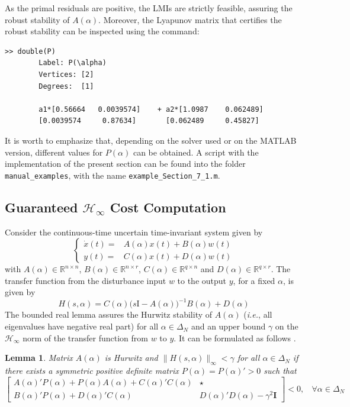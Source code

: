 \documentclass[english,11pt]{article}
\theoremstyle{break} \theorembodyfont{\small\rm}
\newtheorem{lema}{\bf Lemma}
\newenvironment{Plema}
{\begin{lema}} {\hspace*{\fill}\nolinebreak[1]
\end{lema}
}
\newcommand{\Hi}{{\mathcal{H}}_{\infty}}
\begin{document}
As the primal residuals are positive, the LMIs are strictly feasible, assuring the robust stability of $A(\alpha)$. Moreover, the Lyapunov matrix that certifies the robust stability can be inspected using the command:

\begin{minipage}{15.0cm}
	\begin{lstlisting}[rulecolor=\color{red}]
		>> double(P)
		Label: P(\alpha)
		Vertices: [2]
		Degrees:  [1]

		a1*[0.56664   0.0039574]    + a2*[1.0987    0.062489]
		[0.0039574     0.87634]       [0.062489     0.45827]
	\end{lstlisting}
\end{minipage}

It is worth to emphasize that, depending on the solver used or on the MATLAB version, different values for $P(\alpha)$ can be obtained.
A script with the implementation of the present section can be found into the folder \texttt{manual\_examples}, with the name
\texttt{example\_Section\_7\_1.m}.

\subsection{Guaranteed $\Hi$ Cost Computation}\label{sec_example}

Consider the continuous-time uncertain time-invariant system
given by
\begin{equation}\label{eq_syst}
\left\{\begin{array}{rl}
\dot{x}(t) = & A(\alpha)x(t) + B(\alpha)w(t)\\
y(t) = & C(\alpha)x(t) + D(\alpha)w(t)
\end{array}\right.
\end{equation}
with $A(\alpha) \in \mathbb{R}^{n \times n}$, $B(\alpha) \in \mathbb{R}^{n \times r}$,
$C(\alpha) \in \mathbb{R}^{q \times n}$ and $D(\alpha) \in \mathbb{R}^{q \times r}$.
The transfer function from the disturbance input $w$ to the output $y$, for a fixed $\alpha$,
is given by
\[
 H(s,\alpha) = C(\alpha) \big( s \mbox{I} - A(\alpha) \big)^{-1} B(\alpha) + D(\alpha)
\]
The bounded real lemma assures the Hurwitz stability of $A(\alpha)$
(\textit{i.e.}, all eigenvalues have negative real part)
for all $\alpha \in \Delta_N$ and an upper bound $\gamma$ on the $\Hi$ norm of the transfer
function from $w$ to $y$. It can be formulated as follows \cite{BEFB:94}.

\begin{Plema}
Matrix $A(\alpha)$ is Hurwitz and $\| H(s,\alpha) \|_{\infty} < \gamma$ for all $\alpha \in \Delta_N$
if there exists a symmetric positive definite matrix $P(\alpha) = P(\alpha)' > 0$
such that
\begin{equation}\label{eq_cond_hinf}
\left[ \begin{matrix}
A(\alpha)'P(\alpha) + P(\alpha)A(\alpha) + C(\alpha)'C(\alpha) &  \star\\
B(\alpha)'P(\alpha) + D(\alpha)'C(\alpha) & D(\alpha)'D(\alpha) - \gamma^2\mathbf{I}
\end{matrix}  \right]
  < 0 ,  ~~~~\forall \alpha \in \Delta_N
\end{equation}
\end{Plema}
\end{document}
